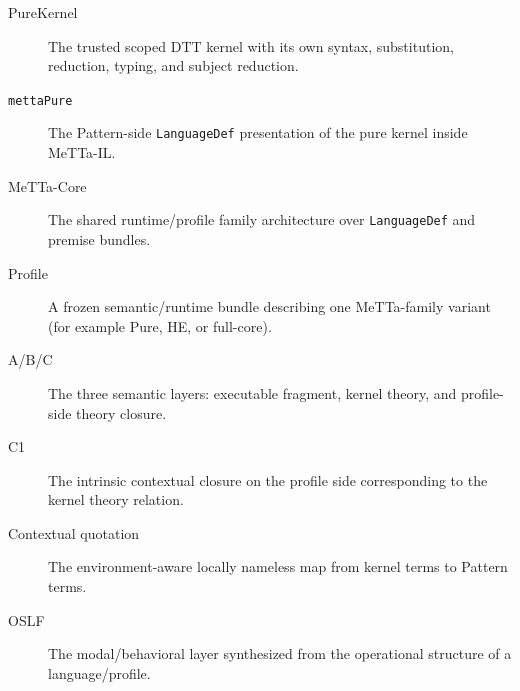 \documentclass[11pt]{article}
\begin{document}
\begin{description}
  \item[PureKernel] The trusted scoped DTT kernel with its own syntax, substitution, reduction, typing, and subject reduction.
  \item[\texttt{mettaPure}] The Pattern-side \texttt{LanguageDef} presentation of the pure kernel inside MeTTa-IL.
  \item[MeTTa-Core] The shared runtime/profile family architecture over \texttt{LanguageDef} and premise bundles.
  \item[Profile] A frozen semantic/runtime bundle describing one MeTTa-family variant (for example Pure, HE, or full-core).
  \item[A/B/C] The three semantic layers: executable fragment, kernel theory, and profile-side theory closure.
  \item[C1] The intrinsic contextual closure on the profile side corresponding to the kernel theory relation.
  \item[Contextual quotation] The environment-aware locally nameless map from kernel terms to Pattern terms.
  \item[OSLF] The modal/behavioral layer synthesized from the operational structure of a language/profile.
\end{description}
\end{document}
